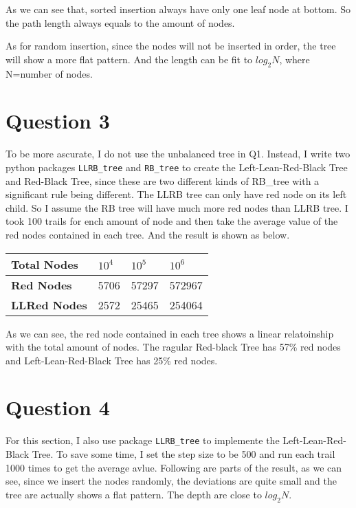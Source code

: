 \documentclass[conference]{IEEEtran}
\begin{document}
As we can see that, sorted insertion always have only one leaf node at bottom. So the path 
length always equals to the amount of nodes.

As for random insertion, since the nodes will not be inserted in order, the tree will show 
a more flat pattern. And the length can be fit to $log_2N$, where N=number of nodes.

\section*{Question 3}

To be more ascurate, I do not use the unbalanced tree in Q1. Instead, I write two python
packages \verb|LLRB_tree| and \verb|RB_tree| to create the Left-Lean-Red-Black Tree and 
Red-Black Tree, since these are two different kinds of RB\_tree with a significant rule 
being different. The LLRB tree can only have red node on its left child. So I assume the 
RB tree will have much more red nodes than LLRB tree. 
I took 100 trails for ench amount of
node and then take the average value of the red nodes contained in each tree. 
And the result is shown as below.

\begin{table}[H]
    \begin{center}
        \begin{tabular}{|l|l|l|l|}
            \hline
            \textbf{Total Nodes} & $10^4$  & $10^5$   & $10^6$    \\ \hline
            \textbf{Red Nodes}   & 5706 & 57297 & 572967 \\ \hline
            \textbf{LLRed Nodes}   & 2572 & 25465 & 254064 \\ \hline
        \end{tabular}
    \end{center}
\end{table}

As we can see, the red node contained in each tree shows a linear relatoinship with the total 
amount of nodes. The ragular Red-black Tree has 57\% red nodes and Left-Lean-Red-Black Tree
has 25\% red nodes.

\section*{Question 4}
For this section, I also use package \verb|LLRB_tree| to implemente the Left-Lean-Red-Black Tree. 
To save some time, I set the step size to be 500 and run each trail 1000 times to get the 
average avlue. Following are parts of the result, as we can see, since we insert the nodes 
randomly, the deviations are quite small and the tree are actually shows a flat pattern. 
The depth are close to $log_2N$.
\end{document}
